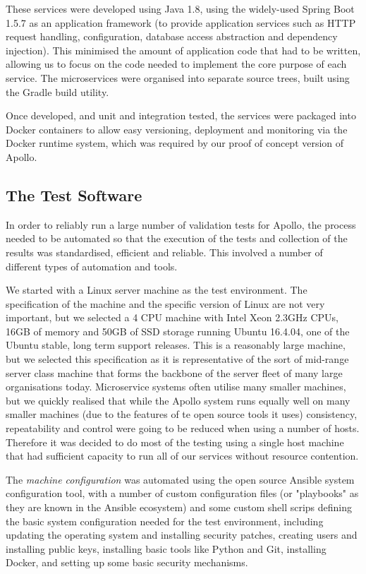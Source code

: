 These services were developed using Java 1.8, using the widely-used Spring Boot 1.5.7 as an application framework (to provide application services such as HTTP request handling, configuration, database access abstraction and dependency injection).  This minimised the amount of application code that had to be written, allowing us to focus on the code needed to implement the core purpose of each service.  The microservices were organised into separate source trees, built using the Gradle build utility.

 Once developed, and unit and integration tested, the services were packaged into Docker containers to allow easy versioning, deployment and monitoring via the Docker runtime system, which was required by our proof of concept version of Apollo.

\subsection{The Test Software}

In order to reliably run a large number of validation tests for Apollo, the process needed to be automated so that the execution of the tests and collection of the results was standardised, efficient and reliable.  This involved a number of different types of automation and tools.

We started with a Linux server machine as the test environment.  The specification of the machine and the specific version of Linux are not very important, but we selected a 4 CPU machine with Intel Xeon 2.3GHz CPUs, 16GB of memory and 50GB of SSD storage running Ubuntu 16.4.04, one of the Ubuntu stable, long term support releases.  This is a reasonably large machine, but we selected this specification as it is representative of the sort of mid-range server class machine that forms the backbone of the server fleet of many large organisations today.  Microservice systems often utilise many smaller machines, but we quickly realised that while the Apollo system runs equally well on many smaller machines (due to the features of te open source tools it uses) consistency, repeatability and control were going to be reduced when using a number of hosts.  Therefore it was decided to do most of the testing using a single host machine that had sufficient capacity to run all of our services without resource contention.

The \emph{machine configuration} was automated using the open source Ansible system configuration tool, with a number of custom configuration files (or "playbooks" as they are known in the Ansible ecosystem) and some custom shell scrips defining the basic system configuration needed for the test environment, including updating the operating system and installing security patches, creating users and installing public keys, installing basic tools like Python and Git, installing Docker, and setting up some basic security mechanisms.

